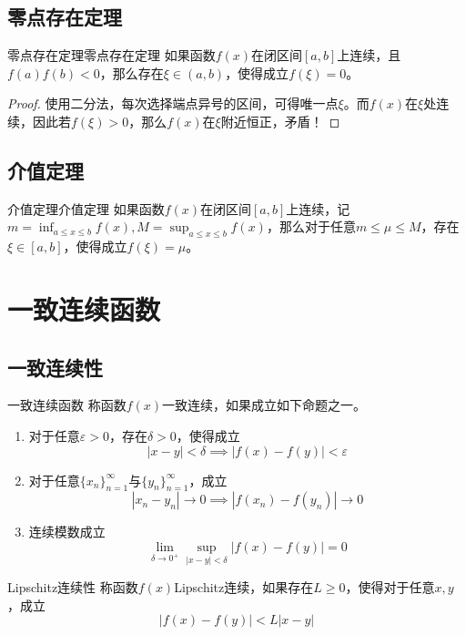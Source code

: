 \documentclass[lang = cn, scheme = chinese, thmcnt = section]{elegantbook}
\begin{document}
\subsection{零点存在定理}

\begin{theorem}{零点存在定理}{零点存在定理}
	如果函数$f(x)$在闭区间$[a,b]$上连续，且$f(a)f(b)<0$，那么存在$\xi\in(a,b)$，使得成立$f(\xi)=0$。
\end{theorem}

\begin{proof}
	使用二分法，每次选择端点异号的区间，可得唯一点$\xi$。而$f(x)$在$\xi$处连续，因此若$f(\xi)>0$，那么$f(x)$在$\xi$附近恒正，矛盾！
\end{proof}

\subsection{介值定理}

\begin{theorem}{介值定理}{介值定理}
	如果函数$f(x)$在闭区间$[a,b]$上连续，记$\displaystyle m=\inf_{a\le x\le b}f(x),M=\sup_{a\le x\le b}f(x)$，那么对于任意$m\le \mu \le M$，存在$\xi\in [a,b]$，使得成立$f(\xi)=\mu$。
\end{theorem}

\section{一致连续函数}

\subsection{一致连续性}

\begin{definition}{一致连续函数}
	称函数$f(x)$一致连续，如果成立如下命题之一。
	\begin{enumerate}
		\item 对于任意$\varepsilon>0$，存在$\delta>0$，使得成立
		$$
		|x-y|<\delta\implies
		|f(x)-f(y)|<\varepsilon
		$$
		\item 对于任意$\{x_n\}_{n=1}^{\infty}$与$\{y_n\}_{n=1}^{\infty}$，成立
		$$
		|x_n-y_n|\to 0\implies
		|f(x_n)-f(y_n)|\to0
		$$
		\item 连续模数成立
		$$
		\lim_{\delta\to0^+}\sup_{|x-y|<\delta}|f(x)-f(y)|=0
		$$
	\end{enumerate}
\end{definition}

\begin{definition}{Lipschitz连续性}
	称函数$f(x)$Lipschitz连续，如果存在$L\ge 0$，使得对于任意$x,y$，成立
	$$
	|f(x)-f(y)|<L|x-y|
	$$
\end{definition}
\end{document}
